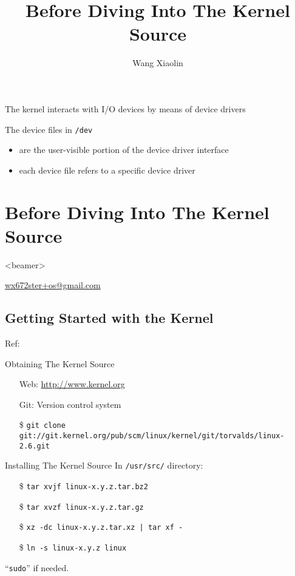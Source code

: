 \begin{frame}
  The kernel interacts with I/O devices by means of device drivers
  \begin{block}{The device files in \texttt{/dev}}
    \begin{itemize}
    \item are the user-visible portion of the device driver interface
    \item each device file refers to a specific device driver
    \end{itemize}
  \end{block}
\end{frame}


\section{Before Diving Into The Kernel Source}

\begin{frame}<beamer>
  \title{Before Diving Into The Kernel Source}
  \author{Wang Xiaolin}
  \titlepage
  \vfill
  {\small{} \url{wx672ster+os@gmail.com}}
\end{frame}

\subsection{Getting Started with the Kernel}

Ref: 

\begin{frame}[fragile=singleslide]{Obtaining The Kernel Source}
  \begin{itemize}
  \item[Web:] \url{http://www.kernel.org}
  \item[Git:] Version control system
  \end{itemize}
  {\scriptsize
    \begin{itemize}
    \item[\$] \texttt{git clone git://git.kernel.org/pub/scm/linux/kernel/git/torvalds/linux-2.6.git}
    \end{itemize}}
\end{frame}

\begin{frame}{Installing The Kernel Source}
  In \texttt{/usr/src/} directory:
  \begin{itemize}
  \item[\$] \texttt{tar xvjf linux-x.y.z.tar.bz2}
  \item[\$] \texttt{tar xvzf linux-x.y.z.tar.gz}
  \item[\$] \texttt{xz -dc linux-x.y.z.tar.xz | tar xf -}
  \item[\$] \texttt{ln -s linux-x.y.z linux}
  \end{itemize}
  ``\texttt{sudo}'' if needed.
\end{frame}

